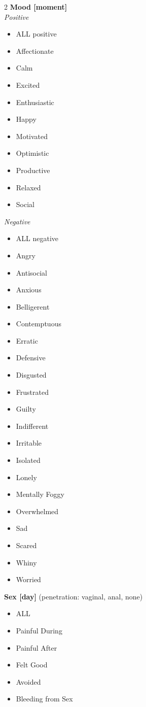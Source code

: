 \begin{multicols}{2}
  \textbf{Mood [moment]}\\
  \textit{Positive}
  \begin{itemize}
    \item ALL positive
    \item Affectionate
    \item Calm
    \item Excited
    \item Enthusiastic
    \item Happy
    \item Motivated
    \item Optimistic
    \item Productive
    \item Relaxed
    \item Social
  \end{itemize}
  \textit{Negative}
  \begin{itemize}
    \item ALL negative
    \item Angry
    \item Antisocial
    \item Anxious
    \item Belligerent
    \item Contemptuous
    \item Erratic
    \item Defensive
    \item Disgusted
    \item Frustrated
    \item Guilty
    \item Indifferent
    \item Irritable
    \item Isolated
    \item Lonely
    \item Mentally Foggy
    \item Overwhelmed
    \item Sad
    \item Scared
    \item Whiny
    \item Worried
  \end{itemize}

  \textbf{Sex [day]} (penetration: vaginal, anal, none)
  \begin{itemize}
    \item ALL
    \item Painful During
    \item Painful After
    \item Felt Good
    \item Avoided
    \item Bleeding from Sex
  \end{itemize}


\end{multicols}
